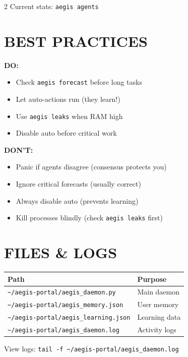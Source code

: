 \documentclass[11pt,a4paper]{article}
\newcommand{\cmd}[1]{\texttt{\textcolor{aegisblue}{#1}}}
\begin{document}
\begin{multicols}{2}
\vspace{5pt}
{\small Current stats: \cmd{aegis agents}}

\section*{\textcolor{aegisblue}{\faLightbulb} BEST PRACTICES}

\textbf{DO:}
\begin{itemize}[leftmargin=12pt,itemsep=1pt]
\item Check \cmd{aegis forecast} before long tasks
\item Let auto-actions run (they learn!)
\item Use \cmd{aegis leaks} when RAM high
\item Disable auto before critical work
\end{itemize}

\textbf{DON'T:}
\begin{itemize}[leftmargin=12pt,itemsep=1pt]
\item Panic if agents disagree (consensus protects you)
\item Ignore critical forecasts (usually correct)
\item Always disable auto (prevents learning)
\item Kill processes blindly (check \cmd{aegis leaks} first)
\end{itemize}

\section*{\textcolor{aegisblue}{\faFileText} FILES & LOGS}

\begin{tabular}{@{}p{3.8cm}p{3.7cm}@{}}
\toprule
\textbf{Path} & \textbf{Purpose} \\
\midrule
\texttt{\textasciitilde/aegis-portal/aegis\_daemon.py} & Main daemon \\
\texttt{\textasciitilde/aegis-portal/aegis\_memory.json} & User memory \\
\texttt{\textasciitilde/aegis-portal/aegis\_learning.json} & Learning data \\
\texttt{\textasciitilde/aegis-portal/aegis\_daemon.log} & Activity logs \\
\bottomrule
\end{tabular}

\vspace{5pt}
View logs: \texttt{tail -f \textasciitilde/aegis-portal/aegis\_daemon.log}


\end{multicols}
\end{document}
